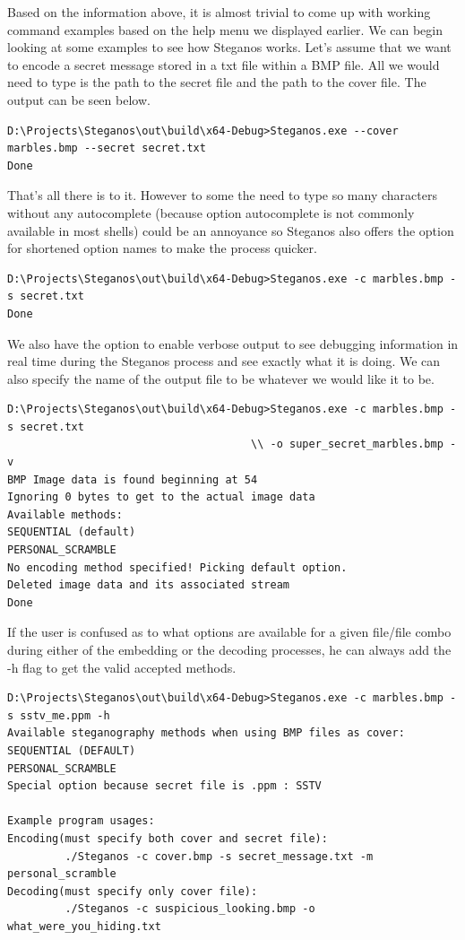 Based on the information above, it is almost trivial to come up with working command examples based on the help menu we displayed earlier. We can begin looking at some examples to see how Steganos works. Let's assume that we want to encode a secret message stored in a txt file within a BMP file. All we would need to type is the path to the secret file and the path to the cover file. The output can be seen below.
\begin{verbatim}
D:\Projects\Steganos\out\build\x64-Debug>Steganos.exe --cover marbles.bmp --secret secret.txt
Done
\end{verbatim}

That's all there is to it. However to some the need to type so many characters without any autocomplete (because option autocomplete is not commonly available in most shells) could be an annoyance so Steganos also offers the option for shortened option names to make the process quicker.
\begin{verbatim}
D:\Projects\Steganos\out\build\x64-Debug>Steganos.exe -c marbles.bmp -s secret.txt
Done
\end{verbatim}

We also have the option to enable verbose output to see debugging information in real time during the Steganos process and see exactly what it is doing. We can also specify the name of the output file to be whatever we would like it to be.
\begin{verbatim}
D:\Projects\Steganos\out\build\x64-Debug>Steganos.exe -c marbles.bmp -s secret.txt 
                                      \\ -o super_secret_marbles.bmp -v
BMP Image data is found beginning at 54
Ignoring 0 bytes to get to the actual image data
Available methods:
SEQUENTIAL (default)
PERSONAL_SCRAMBLE
No encoding method specified! Picking default option.
Deleted image data and its associated stream
Done
\end{verbatim}

If the user is confused as to what options are available for a given file/file combo during either of the embedding or the decoding processes, he can always add the -h flag to get the valid accepted methods.
\begin{verbatim}
D:\Projects\Steganos\out\build\x64-Debug>Steganos.exe -c marbles.bmp -s sstv_me.ppm -h
Available steganography methods when using BMP files as cover:
SEQUENTIAL (DEFAULT)
PERSONAL_SCRAMBLE
Special option because secret file is .ppm : SSTV

Example program usages:
Encoding(must specify both cover and secret file):
         ./Steganos -c cover.bmp -s secret_message.txt -m personal_scramble
Decoding(must specify only cover file):
         ./Steganos -c suspicious_looking.bmp -o what_were_you_hiding.txt
\end{verbatim}

